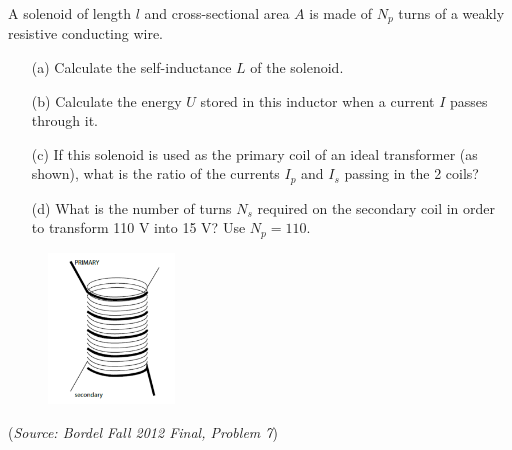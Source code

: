 \documentclass{article}
\begin{document}
A solenoid of length $l$ and cross-sectional area $A$ is made of $N_p$ turns of a weakly resistive conducting wire.
\begin{itemize}
	\item[(a)] Calculate the self-inductance $L$ of the solenoid.
	\item[(b)] Calculate the energy $U$ stored in this inductor when a current $I$ passes through it.
	\item[(c)] If this solenoid is used as the primary coil of an ideal transformer (as shown), what is the ratio of the currents $I_p$ and $I_s$ passing in the 2 coils?
	\item[(d)] What is the number of turns $N_s$ required on the secondary coil in order to transform 110 V into 15 V? Use $N_p=110$.
\end{itemize}
\begin{figure}[h]
	\begin{center}
		\includegraphics[width=0.3\textwidth]{Transformer.png}
	\end{center}
\end{figure}

(\textit{Source: Bordel Fall 2012 Final, Problem 7})
\end{document}
